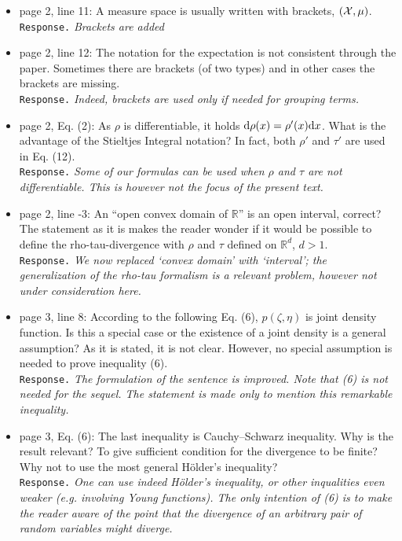 \documentclass[a4paper,12pt]{article}
\newcommand{\Ro}{\mathbb R}
\newcommand{\upd}{{\rm d}}
\begin{document}
\begin{itemize}
\item page 2, line 11: A measure space is usually written with brackets, $({\cal X}, \mu)$. \\
{\tt Response.}  
{\it Brackets are added}


\item page 2, line 12: The notation for the expectation is not consistent
through the paper. Sometimes there are brackets (of two types) and in
other cases the brackets are missing. \\
{\tt Response.} {\it Indeed, brackets are used only if needed for grouping terms.}

\item page 2, Eq. (2): As $\rho$ is differentiable, it holds $\upd\rho(x) = \rho'(x)\upd x$. What
is the advantage of the Stieltjes Integral notation? In fact, both $\rho'$ and $\tau'$
are used in Eq. (12). \\
{\tt Response.}
{\it  Some of our formulas can be used when $\rho$ and $\tau$ are not differentiable.
 This is however not the focus of the present text.}

\item page 2, line -3: An “open convex domain of $\Ro$” is an open interval,
correct? The statement as it is makes the reader wonder if it would be
possible to define the rho-tau-divergence with $\rho$ and $\tau$ defined on $\Ro^d$, $d > 1$. \\
{\tt Response.} 
{\it We now replaced `convex domain'  with `interval'; the generalization of the rho-tau formalism
 is a relevant problem, however not under consideration here.}

\item page 3, line 8: According to the following Eq. (6), $p(\zeta,\eta)$ is joint density
function. Is this a special case or the existence of a joint density is a
general assumption? As it is stated, it is not clear. However, no special
assumption is needed to prove inequality (6). \\
{\tt Response.} {\it The formulation of the sentence is improved.
 Note that (6) is not needed for the sequel. The statement is made only
 to mention this remarkable inequality. }

\item page 3, Eq. (6): The last inequality is Cauchy–Schwarz inequality. Why
is the result relevant? To give sufficient condition for the divergence to be
finite? Why not to use the most general H\"older’s inequality? \\
{\tt Response.} 
{\it One can use indeed H\"older’s inequality, or other inqualities even weaker (e.g. involving Young functions). The only intention of (6)
 is to make the reader aware of the point that the divergence of an arbitrary pair
 of random variables might diverge.}


\end{itemize}
\end{document}
